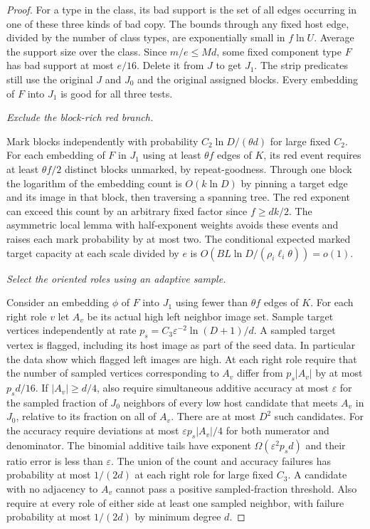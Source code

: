 \documentclass[11pt]{amsart}
\theoremstyle{definition}
\theoremstyle{remark}
\numberwithin{equation}{section}
\begin{document}
\begin{proof}
For a type in the class, its bad support is the set of all edges occurring in one of these three kinds of bad copy. The bounds through any fixed host edge, divided by the number of class types, are exponentially small in $f\ln U $. Average the support size over the class. Since $ m/e\le Md $, some fixed component type $ F $ has bad support at most $ e/16$. Delete it from $ J $ to get $ J_1$. The strip predicates still use the original $ J $ and $ J_0$ and the original assigned blocks. Every embedding of $ F $ into $ J_1$ is good for all three tests.

\medskip\noindent\emph{Exclude the block-rich red branch.}

Mark blocks independently with probability $C_2\ln D/(\theta d)$ for large fixed $ C_2$. For each embedding of $ F $ in $ J_1$ using at least $\theta f $ edges of $ K $, its red event requires at least $\theta f/2$ distinct blocks unmarked, by repeat-goodness. Through one block the logarithm of the embedding count is $ O(k\ln D)$ by pinning a target edge and its image in that block, then traversing a spanning tree. The red exponent can exceed this count by an arbitrary fixed factor since $ f\ge dk/2$. The asymmetric local lemma with half-exponent weights avoids these events and raises each mark probability by at most two. The conditional expected marked target capacity at each scale divided by $ e $ is $ O(BL\ln D/(\rho_i\ell_i\theta))=o(1)$.

\medskip\noindent\emph{Select the oriented roles using an adaptive sample.}

Consider an embedding $\phi $ of $ F $ into $ J_1$ using fewer than $\theta f $ edges of $ K $. For each right role $ v $ let $ A_v $ be its actual high left neighbor image set. Sample target vertices independently at rate $ p_s=C_3\varepsilon^{-2}\ln(D+1)/d $. A sampled target vertex is flagged, including its host image as part of the seed data. In particular the data show which flagged left images are high. At each right role require that the number of sampled vertices corresponding to $ A_v $ differ from $ p_s|A_v|$ by at most $ p_s d/16$. If $|A_v|\ge d/4$, also require simultaneous additive accuracy at most $\varepsilon $ for the sampled fraction of $ J_0$ neighbors of every low host candidate that meets $ A_v $ in $ J_0$, relative to its fraction on all of $ A_v $. There are at most $ D^2$ such candidates. For the accuracy require deviations at most $\varepsilon p_s|A_v|/4$ for both numerator and denominator. The binomial additive tails have exponent $\Omega(\varepsilon^2 p_s d)$ and their ratio error is less than $\varepsilon $. The union of the count and accuracy failures has probability at most $1/(2d)$ at each right role for large fixed $ C_3$. A candidate with no adjacency to $ A_v $ cannot pass a positive sampled-fraction threshold. Also require at every role of either side at least one sampled neighbor, with failure probability at most $1/(2d)$ by minimum degree $ d$.


\end{proof}
\end{document}
